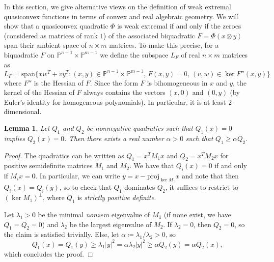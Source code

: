 \documentclass[a4paper]{article}
\numberwithin{equation}{section}
\newcommand{\ProjP}{\mathbb{P}}
\renewcommand{\P}{\mathbb{P}}
\newtheorem{lemma}[theorem]{Lemma}
\theoremstyle{definition}
\theoremstyle{remark}
\begin{document}
In this section, we give alternative views on the definition of weak extremal quasiconvex functions in terms of convex and real algebraic geometry.
We will show that a quasiconvex quadratic $\Phi$ is weak extremal if and only if the zeroes (considered as matrices of rank $1$) of the associated biquadratic $F = \Phi(x\otimes y)$ span their ambient space of $n\times m$ matrices. 
To make this precise, for a biquadratic $F$ on $\P^{n-1}\times \P^{m-1}$ we define the subspace $L_F$ of real $n\times m$ matrices as 
$$L_F = \mathrm{span} \{xw^T+vy^T\colon (x,y) \in \ProjP^{n-1 }\times \ProjP^{m-1},\, F(x,y) = 0,\,  (v,w) \in \ker F''(x,y) \}$$
where $F''$ is the Hessian of $F$.
Since the form $F$ is bihomogeneous in $x$ and $y$, the kernel of the Hessian of $F$ always contains the vectors $(x,0)$ and $(0,y)$ (by Euler's identity for homogeneous polynomials). In particular, it is at least $2$-dimensional.

\begin{lemma}\label{lemma:difference_two_nonnegative_quadratics}
Let $Q_1$ and $Q_2$ be nonnegative quadratics such that $Q_1(x)=0$ implies $Q_2(x)=0$.  Then there exists a real number $\alpha > 0$ such that $Q_1 \geq \alpha Q_2$.
\end{lemma}
\begin{proof}
The quadratics can be written as $Q_1 = x^TM_1x$ and $Q_2 = x^TM_2x$ for positive semidefinite matrices $M_1$ and $M_2$. We have that $Q_i(x)=0$ if and only if $M_ix=0$. In particular, we can write $y=x-\mathrm{proj}_{\ker M_1}x$ and note that then $Q_i(x)=Q_i(y)$, so to check that $Q_1$ dominates $Q_2$, it suffices to restrict to $(\ker M_1)^\perp$, where $Q_1$ is \emph{strictly positive definite}. 

Let $\lambda_1>0$ be the minimal \emph{nonzero} eigenvalue of $M_1$ (if none exist, we have $Q_1=Q_2=0$) and $\lambda_2$ be the largest eigenvalue of $M_2$.
If $\lambda_2=0$, then $Q_2=0$, so the claim is satisfied trivially.
Else, let $\alpha \coloneqq \lambda_1/\lambda_2>0$, so 
$$
Q_1(x)=Q_1(y)\geq \lambda_1 |y|^2= \alpha\lambda_2|y|^2\geq \alpha Q_2(y)=\alpha Q_2(x),
$$
which concludes the proof.
\end{proof}
\end{document}
